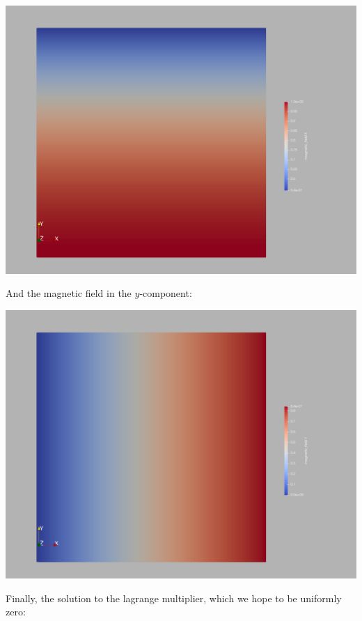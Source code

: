 \documentclass{article}
\begin{document}
                \begin{center}
                \includegraphics[scale=.2]{mag_x.png}
                \end{center}

                And the magnetic field in the $y$-component:

                \begin{center}
                \includegraphics[scale=.2]{mag_y.png}
                \end{center}

                Finally, the solution to the lagrange multiplier, which we hope to be uniformly zero:
\end{document}
